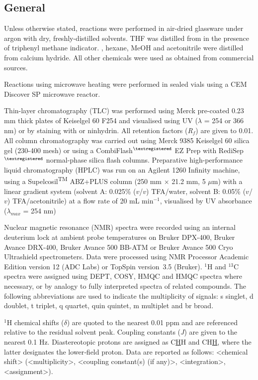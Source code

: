 

\subsection{General}

Unless otherwise stated, reactions were performed in air-dried glassware under argon with dry, freshly-distilled solvents. THF was distilled from  in the presence of triphenyl methane indicator. , hexane, MeOH and acetonitrile were distilled from calcium hydride. All other chemicals were used as obtained from commercial sources.

Reactions using microwave heating were performed in sealed vials using a CEM Discover SP microwave reactor. 

Thin-layer chromatography (TLC) was performed using Merck pre-coated 0.23 mm thick plates of Keiselgel 60 F254 and visualised using UV ($\lambda$ = 254 or 366 nm) or by staining with  or ninhydrin. 
All retention factors (\textit{R}$_\textit{f}$) are given to 0.01. 
All column chromatography was carried out using Merck 9385 Keiselgel 60 silica gel (230-400 mesh) or using a CombiFlash$^{\tiny{\textregistered}}$ EZ Prep with RediSep$^{\tiny{\textregistered}}$ normal-phase silica flash columns. 
Preparative high-performance liquid chromatography (HPLC) was run on an Agilent 1260 Infinity machine, using a Supelcosil\textsuperscript{TM} ABZ+PLUS column (250 mm $\times$ 21.2 mm, 5 $\mu$m) with a linear gradient system (solvent A: 0.025\% ($v$/$v$) TFA/water, solvent B: 0.05\% ($v$/$v$) TFA/acetonitrile) at a flow rate of 20 mL min$^{-1}$, visualised by UV absorbance ($\lambda_{max}$ = 254 nm)

Nuclear magnetic resonance (NMR) spectra were recorded using an internal deuterium lock at ambient probe temperatures on Bruker DPX-400, Bruker Avance DRX-400, Bruker Avance 500 BB-ATM or Bruker Avance 500 Cryo Ultrashield spectrometers. Data were processed using NMR Processor Academic Edition version 12 (ADC Labs) or TopSpin version 3.5 (Bruker). $^1$H and $^13$C spectra were assigned using DEPT, COSY, HMQC and HMQC spectra where necessary, or by analogy to fully interpreted spectra of related compounds. The following abbreviations are used to indicate the multiplicity of signals: s singlet, d doublet, t triplet, q quartet, quin quintet, m multiplet and br broad.

$^1$H chemical shifts ($\delta$) are quoted to the nearest 0.01 ppm and are referenced relative to the residual solvent peak\cite{Gottlieb1997}. Coupling constants (\textit{J}) are given to the nearest 0.1 Hz. Diastereotopic protons are assigned as C\underline{H}H and CH\underline{H},
where the latter designates the lower‑field proton. Data are reported as follows: <chemical shift> (<multiplicity>, <coupling constant(s) (if any)>, <integration>, <assignment>).

